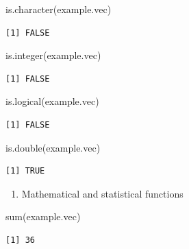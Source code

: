 \documentclass[
  letterpaper,
  DIV=11,
  numbers=noendperiod]{scrreprt}
\newenvironment{Shaded}{\begin{snugshade}}{\end{snugshade}}
\newcommand{\FunctionTok}[1]{\textcolor[rgb]{0.28,0.35,0.67}{#1}}
\newcommand{\NormalTok}[1]{\textcolor[rgb]{0.00,0.23,0.31}{#1}}
\providecommand{\tightlist}{%
  \setlength{\itemsep}{0pt}\setlength{\parskip}{0pt}}\usepackage{longtable,booktabs,array}
\begin{document}
\begin{Shaded}
\begin{Highlighting}[]
\FunctionTok{is.character}\NormalTok{(example.vec)}
\end{Highlighting}
\end{Shaded}

\begin{verbatim}
[1] FALSE
\end{verbatim}

\begin{Shaded}
\begin{Highlighting}[]
\FunctionTok{is.integer}\NormalTok{(example.vec)}
\end{Highlighting}
\end{Shaded}

\begin{verbatim}
[1] FALSE
\end{verbatim}

\begin{Shaded}
\begin{Highlighting}[]
\FunctionTok{is.logical}\NormalTok{(example.vec)}
\end{Highlighting}
\end{Shaded}

\begin{verbatim}
[1] FALSE
\end{verbatim}

\begin{Shaded}
\begin{Highlighting}[]
\FunctionTok{is.double}\NormalTok{(example.vec)}
\end{Highlighting}
\end{Shaded}

\begin{verbatim}
[1] TRUE
\end{verbatim}

\begin{enumerate}
\def\labelenumi{\arabic{enumi}.}
\setcounter{enumi}{3}
\tightlist
\item
  Mathematical and statistical functions
\end{enumerate}

\begin{Shaded}
\begin{Highlighting}[]
\FunctionTok{sum}\NormalTok{(example.vec)}
\end{Highlighting}
\end{Shaded}

\begin{verbatim}
[1] 36
\end{verbatim}
\end{document}
